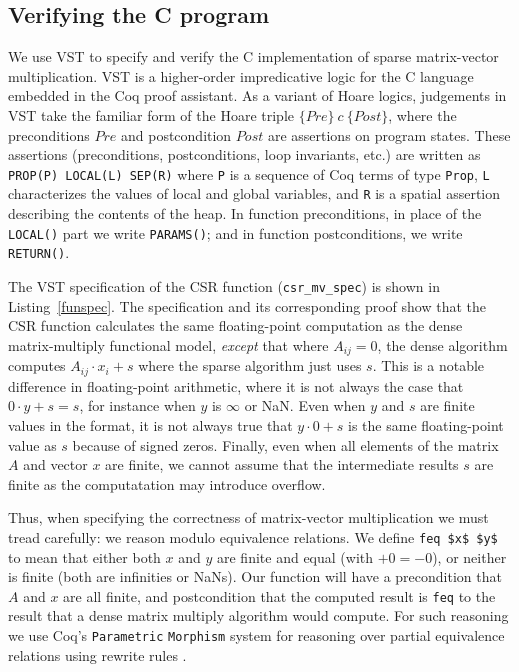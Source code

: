\subsection{Verifying the C program}
We use VST \cite{vst-floyd} to specify and verify the C
implementation of sparse matrix-vector multiplication.  VST is a higher-order impredicative logic for the C language embedded in the Coq proof assistant.  As a variant of Hoare logics,  judgements in VST take the familiar form of the Hoare triple $ \{Pre\} \ c \ \{Post\}$, where the preconditions $Pre$ and postcondition $Post$ are assertions on program states.  
These assertions (preconditions, postconditions, loop invariants, etc.)
are written as \lstinline{PROP(P) LOCAL(L) SEP(R)} where \lstinline{P} is a sequence of Coq terms of type \lstinline{Prop},  \lstinline{L} characterizes the values
of local and global variables, and \lstinline{R} is a spatial assertion describing the contents of the
heap. In function preconditions, in place of the \lstinline{LOCAL()} part we write \lstinline{PARAMS()};
and in function postconditions, we write \lstinline{RETURN()}.

The VST specification of the CSR function (\lstinline{csr_mv_spec}) is shown in Listing~\ref{funspec}.  The specification and its corresponding proof 
show that the CSR function calculates the same floating-point computation as the dense matrix-multiply functional model, \emph{except} that where $A_{ij}=0$,  the dense algorithm computes $A_{ij}\cdot x_i+s$ where the sparse algorithm just uses $s$. This is a notable difference in floating-point arithmetic, where it is not always the case that
$0\cdot y+s=s$,  for instance when $y$ is $\infty$ or
NaN.  Even when $y$ and $s$ are finite values in the format, it is
not always true that $y\cdot 0+s$ is the same floating-point
value as $s$ because of signed zeros.  Finally, even when all elements of the matrix $A$ and vector $x$ are 
finite, we cannot assume that the intermediate results $s$ are
finite as the computatation may introduce overflow.  

Thus, when specifying the correctness of matrix-vector multiplication we must tread carefully:
we reason modulo equivalence relations.
We define \lstinline{feq $x$ $y$} to mean that either
both $x$ and $y$ are finite and equal (with $+0=-0$),
or neither is finite (both are infinities or NaNs).
Our function will have a precondition that
$A$ and $x$ are all finite, and postcondition that
the computed result is \lstinline{feq} to the
result that a dense matrix multiply algorithm would compute. For such reasoning we use Coq's
\lstinline{Parametric} \lstinline{Morphism} system for reasoning over partial
equivalence relations using rewrite rules \cite{sozeau09:rewriting}.


